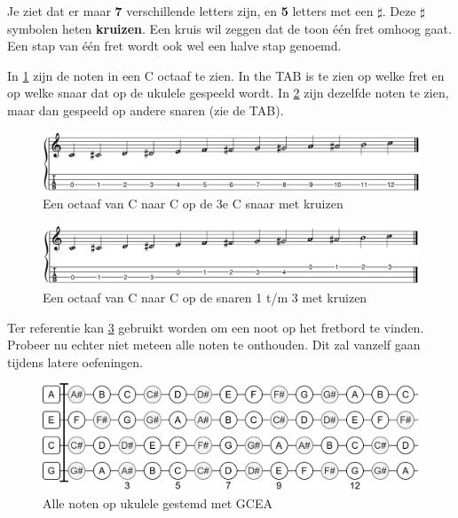 Je ziet dat er maar \textbf{7} verschillende letters zijn, en \textbf{5} letters met een \textbf{$\sharp$}. Deze $\sharp$ symbolen heten \textbf{kruizen}. Een kruis wil zeggen dat de toon één fret omhoog gaat. Een stap van één fret wordt ook wel een halve stap genoemd.


In \ref{fig:ukulele_single_string_octave_sharps} zijn de noten in een C octaaf te zien. In the TAB is te zien op welke fret en op welke snaar dat op de ukulele gespeeld wordt. In \ref{fig:ukulele_multi_string_octave_sharps} zijn dezelfde noten te zien, maar dan gespeeld op andere snaren (zie de TAB).

\begin{figure}[h]
    \centering
    \includegraphics[width=\textwidth]{../MuseScore/Ukulele/UkuleleChromaticNotesSharpsSingleString.png}
    \caption{Een octaaf van C naar C op de 3e C snaar met kruizen}
    \label{fig:ukulele_single_string_octave_sharps}
\end{figure}

\begin{figure}[h]
    \centering
    \includegraphics[width=\textwidth]{../MuseScore/Ukulele/UkuleleChromaticNotesSharpsMultiString.png}
    \caption{Een octaaf van C naar C op de snaren 1 t/m 3 met kruizen}
    \label{fig:ukulele_multi_string_octave_sharps}
\end{figure}

\newpage

Ter referentie kan \ref{fig:ukulele_fretboard_filled} gebruikt worden om een noot op het fretbord te vinden. Probeer nu echter niet meteen alle noten te onthouden. Dit zal vanzelf gaan tijdens latere oefeningen.

\begin{figure}[h]
    \centering
    \includegraphics[width=\textwidth]{../Images/Fretboard-Ukulele-filled.png}
    \caption{Alle noten op ukulele gestemd met GCEA}
    \label{fig:ukulele_fretboard_filled}
\end{figure}

